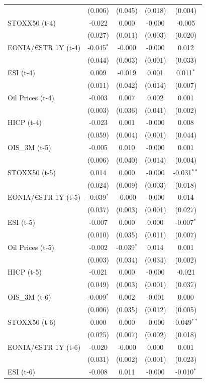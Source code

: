 \begin{longtable}[t]{lcccc}
 & (0.006) & (0.045) & (0.018) & (0.004)\\
STOXX50 (t-4) & -0.022 & 0.000 & -0.000 & -0.005\\
 & (0.027) & (0.011) & (0.003) & (0.020)\\
EONIA/€STR 1Y (t-4) & -0.045$^{*}$ & -0.000 & -0.000 & 0.012\\
 & (0.044) & (0.003) & (0.001) & (0.033)\\
ESI (t-4) & 0.009 & -0.019 & 0.001 & 0.011$^{*}$\\
 & (0.011) & (0.042) & (0.014) & (0.007)\\
Oil Prices (t-4) & -0.003 & 0.007 & 0.002 & 0.001\\
 & (0.003) & (0.036) & (0.041) & (0.002)\\
HICP (t-4) & -0.023 & 0.001 & -0.000 & 0.008\\
 & (0.059) & (0.004) & (0.001) & (0.044)\\
OIS\_3M (t-5) & -0.005 & 0.010 & -0.000 & 0.001\\
 & (0.006) & (0.040) & (0.014) & (0.004)\\
STOXX50 (t-5) & 0.014 & 0.000 & -0.000 & -0.031$^{**}$\\
 & (0.024) & (0.009) & (0.003) & (0.018)\\
EONIA/€STR 1Y (t-5) & -0.039$^{*}$ & -0.000 & -0.000 & 0.014\\
 & (0.037) & (0.003) & (0.001) & (0.027)\\
ESI (t-5) & -0.007 & 0.000 & 0.000 & -0.007$^{*}$\\
 & (0.010) & (0.035) & (0.011) & (0.007)\\
Oil Prices (t-5) & -0.002 & -0.039$^{*}$ & 0.014 & 0.001\\
 & (0.003) & (0.034) & (0.034) & (0.002)\\
HICP (t-5) & -0.021 & 0.000 & -0.000 & -0.021\\
 & (0.049) & (0.003) & (0.001) & (0.037)\\
OIS\_3M (t-6) & -0.009$^{*}$ & 0.002 & -0.001 & 0.000\\
 & (0.006) & (0.035) & (0.012) & (0.005)\\
STOXX50 (t-6) & 0.000 & 0.000 & -0.000 & -0.049$^{**}$\\
 & (0.025) & (0.007) & (0.002) & (0.018)\\
EONIA/€STR 1Y (t-6) & -0.020 & -0.000 & 0.000 & 0.001\\
 & (0.031) & (0.002) & (0.001) & \vphantom{1} (0.023)\\
ESI (t-6) & -0.008 & 0.011 & -0.000 & -0.010$^{*}$\\

\end{longtable}
